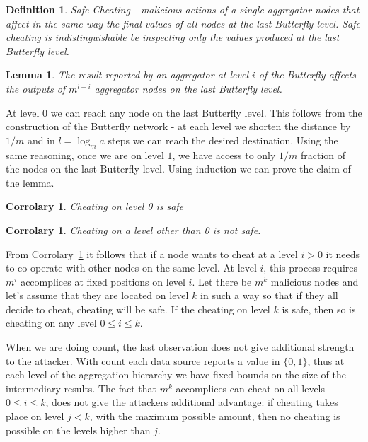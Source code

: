 \documentclass{article}
\newtheorem{lem}[thm]{Lemma}
\newtheorem{defn}[thm]{Definition}
\newtheorem{cor}[thm]{Corrolary}
\newenvironment{proof}[1][Proof]{\begin{trivlist}
\item[\hskip \labelsep {\bfseries #1}]}{\end{trivlist}}
\begin{document}
\begin{defn}
{\it Safe Cheating} - malicious actions of a single aggregator nodes
that affect in the same way the final values of all nodes at the
last Butterfly level. Safe cheating is indistinguishable be inspecting
only the values produced at the last Butterfly level.
\end{defn}

\begin{lem}
The result reported by an aggregator at level $i$ of the Butterfly
affects the outputs of $m^{l-i}$ aggregator nodes on the last
Butterfly level.
\end{lem}

\begin{proof}
At level $0$ we can reach any node on the last Butterfly level. This
follows from the construction of the Butterfly network - at each level
we shorten the distance by $1/m$ and in $l = \log_m{a}$ steps we can
reach the desired destination. Using the same reasoning, once we
are on level $1$, we have access to only $1/m$ fraction of the nodes
on the last Butterfly level. Using induction we can prove the claim of
the lemma.
\end{proof}

\begin{cor}
Cheating on level 0 is safe
\end{cor}


\begin{cor}\label{cor:no_safe}
Cheating on a level other than 0 is not safe.
\end{cor}

From Corrolary~\ref{cor:no_safe} it follows that if a node wants to
cheat at a level $i > 0$ it needs to co-operate with other nodes on
the same level. At level $i$, this process requires $m^i$ accomplices
at fixed positions on level $i$. Let there be $m^k$ malicious nodes
and let's assume that they are located on level $k$ in such a way so
that if they all decide to cheat, cheating will be safe. If the
cheating on level $k$ is safe, then so is cheating on any level $0 \leq i \leq k$.

When we are doing count, the last observation does not give additional
strength to the attacker. With count each data source reports a value
in $\{0, 1\}$, thus at each level of the aggregation hierarchy we have
fixed bounds on the size of the intermediary results. The fact that
$m^k$ accomplices can cheat on all levels $0 \leq i \leq k$, does  not
give the attackers additional advantage: if cheating takes place on
level $j < k$, with the maximum possible amount, then no cheating is
possible on the levels higher than $j$.   

%
\end{document}
